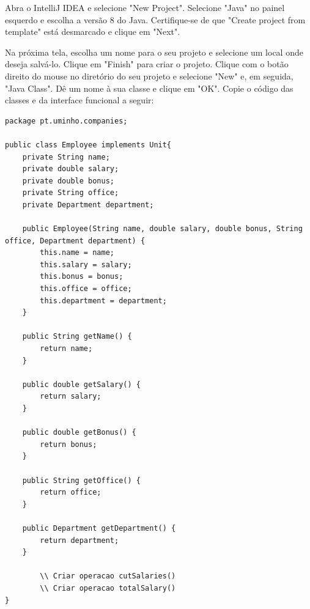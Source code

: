 \documentclass{article}
\begin{document}
Abra o IntelliJ IDEA e selecione "New Project". Selecione "Java" no painel esquerdo e escolha a versão 8 do Java. Certifique-se de que "Create project from template" está desmarcado e clique em "Next".

Na próxima tela, escolha um nome para o seu projeto e selecione um local onde deseja salvá-lo. Clique em "Finish" para criar o projeto. Clique com o botão direito do mouse no diretório do seu projeto e selecione "New" e, em seguida, "Java Class". Dê um nome à sua classe e clique em "OK". Copie o código das classes e da interface funcional a seguir:

\newpage 

\begin{lstlisting}[caption={Classe Employee},label={anoniTolambda},captionpos=t]
package pt.uminho.companies;

public class Employee implements Unit{
	private String name; 
	private double salary;
	private double bonus;
	private String office;
	private Department department;
	
	public Employee(String name, double salary, double bonus, String office, Department department) {
		this.name = name;
		this.salary = salary;
		this.bonus = bonus;
		this.office = office;
		this.department = department;
	}

	public String getName() {
		return name;
	}

	public double getSalary() {
		return salary;
	}

	public double getBonus() {
		return bonus;
	}
		
	public String getOffice() {
		return office;
	}
	
	public Department getDepartment() {
		return department;
	}
        
        \\ Criar operacao cutSalaries()
        \\ Criar operacao totalSalary()
}
\end{lstlisting}

\newpage
\end{document}
